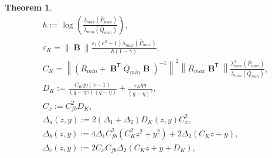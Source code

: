 \documentclass[letterpaper, 10 pt, conference]{ieeeconf}  %
\DeclareMathOperator{\contB}{\mathbf{B}}
\newtheorem{theorem}{Theorem}
\begin{document}
\begin{theorem}
\begin{align*}
        &h := \log(\frac{\lambda_{max}(\bar{P}_{max})}{\lambda_{min}(\bar{Q}_{min})}),\\
        &\varepsilon_{K} =\|\contB\|\frac{\varepsilon_{1}(e^{h}-1)\lambda_{max}(\bar{P}_{max})}{h(1-\gamma)},\\
        &C_{K} = \left\|(\bar{R}_{min}+\contB^{\mathsf{T}}\bar{Q}_{min}\contB)^{-1}\right\|^{2}\left\|\bar{R}_{max}\contB^{\mathsf{T}}\right\|\frac{\lambda_{max}^{2}(\bar{P}_{max})}{\lambda_{min}(\bar{Q}_{min})},\\
        &D_{K} := \frac{C_{K}q\eta(\gamma-1)}{(q-\eta\gamma)(q-\eta)} + \frac{\varepsilon_{K}q\eta}{(q-\eta)^{2}},\\
        &C_{x} := C_{fb}^{2}D_{K},\\
        &\Delta_{a}(z,y) := 2(\Delta_{1}+\Delta_{2})D_{K}(z,y)C_{x}^{2},\\
        &\Delta_{b}(z,y) := 4\Delta_{1}C_{fb}^{2}(C_{K}^{2}z^{2}+y^{2})+2\Delta_{2}(C_{K}z+y),\\
        &\Delta_{c}(z,y) := 2C_{x}C_{fb}\Delta_{2}(C_{K}z+y+D_{K}),\\
    \end{align*}
\end{theorem}

\end{document}
